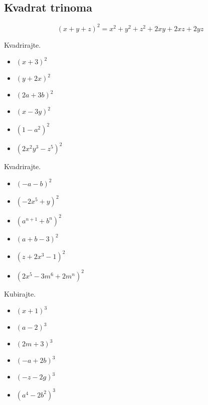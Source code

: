         
                \subsection*{Kvadrat trinoma}
                    $$ (x+y+z)^2=x^2+y^2+z^2+2xy+2xz+2yz $$
                
            
        
                \begin{naloga}
                    Kvadrirajte.
                    \begin{itemize}
                        \item $(x+3)^2$ 
                        \item $(y+2x)^2$ 
                        \item $(2a+3b)^2$ 
                        \item $(x-3y)^2$ 
                        \item $(1-a^2)^2$ 
                        \item $(2x^2y^3-z^5)^2$ 
                    \end{itemize}
                \end{naloga}


                \begin{naloga}
                    Kvadrirajte.
                    \begin{itemize}
                        \item $(-a-b)^2$ 
                        \item $(-2x^5+y)^2$ 
                        \item $(a^{n+1}+b^n)^2$ 
                        \item $(a+b-3)^2$ 
                        \item $(z+2x^3-1)^2$ 
                        \item $(2x^5-3m^6+2m^n)^2$ 
                    \end{itemize}
                \end{naloga}


                \begin{naloga}
                    Kubirajte.
                    \begin{itemize}
                        \item $(x+1)^3$ 
                        \item $(a-2)^3$ 
                        \item $(2m+3)^3$ 
                        \item $(-a+2b)^3$ 
                        \item $(-z-2g)^3$ 
                        \item $(a^4-2b^2)^3$ 
                    \end{itemize}
                \end{naloga}


